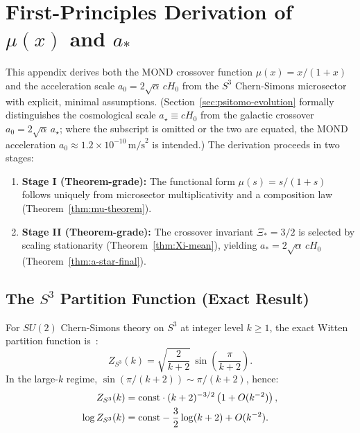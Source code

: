 \section{First-Principles Derivation of $\mu(x)$ and $a_*$}\label{app:mu-derivation}

This appendix derives both the MOND crossover function $\mu(x) = x/(1+x)$ and the acceleration scale $a_0 = 2\sqrt{\alpha}\,cH_0$ from the $S^3$ Chern-Simons microsector with explicit, minimal assumptions.  (Section~\ref{sec:psitomo-evolution} formally distinguishes the cosmological scale $a_\star \equiv cH_0$ from the galactic crossover $a_0 = 2\sqrt{\alpha}\,a_\star$; where the subscript is omitted or the two are equated, the MOND acceleration $a_0 \approx 1.2 \times 10^{-10}\,\mathrm{m/s}^2$ is intended.) The derivation proceeds in two stages:
\begin{enumerate}
\item \textbf{Stage I (Theorem-grade):} The functional form $\mu(s) = s/(1+s)$ follows uniquely from microsector multiplicativity and a composition law (Theorem~\ref{thm:mu-theorem}).
\item \textbf{Stage II (Theorem-grade):} The crossover invariant $\Xi_* = 3/2$ is selected by scaling stationarity (Theorem~\ref{thm:Xi-mean}), yielding $a_* = 2\sqrt{\alpha}\,cH_0$ (Theorem~\ref{thm:a-star-final}).
\end{enumerate}

\subsection{The $S^3$ Partition Function (Exact Result)}

\begin{lemma}\label{lem:Zcs-asymptotic}
For $SU(2)$ Chern-Simons theory on $S^3$ at integer level $k \geq 1$, the exact Witten partition function is~\cite{Witten1989}:
\begin{equation}
Z_{S^3}(k) = \sqrt{\frac{2}{k+2}}\,\sin\left(\frac{\pi}{k+2}\right).
\label{eq:Zcs-exact}
\end{equation}
In the large-$k$ regime, $\sin(\pi/(k+2)) \sim \pi/(k+2)$, hence:
\begin{align}
Z_{S^3}(k) &= \mathrm{const} \cdot (k+2)^{-3/2}\left(1 + O(k^{-2})\right),
\label{eq:Zcs-asym}\\
\log Z_{S^3}(k) &= \mathrm{const} - \frac{3}{2}\log(k+2) + O(k^{-2}). \notag
\end{align}
\end{lemma}

